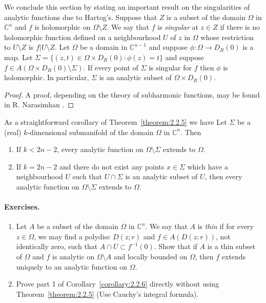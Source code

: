We conclude this section by stating an important result on the singularities of analytic functions due to Hartog's. Suppose that $Z$ is a subset of the domain $\Omega$ in $\mathbb C^n$ and $f$ is holomorphic on $\Omega\setminus Z$. We say that $f$ is \emph{singular} at $z\in Z$ if there is no holomorphic function defined on a neighbourhood $U$ of $z$ in $\Omega$ whose restriction to $U\setminus Z$ is $f|U\setminus Z$.
 Let $\Omega$ be a domain in $\mathbb C^{n-1}$ and suppose $\phi:\Omega\to D_R(0)$ is a map. Let $\Sigma=\{(z,t)\in\Omega\times D_R(0):\phi(z)=t\}$ and suppose $f\in A(\Omega\times D_R(0)\setminus\Sigma)$. If every point of $\Sigma$ is singular for $f$ then $\phi$ is holomorphic. In particular, $\Sigma$ is an analytic subset of $\Omega\times D_R(0)$.
\begin{proof}
A proof, depending on the theory of subharmonic functions, may be found in R. Narasimhan \cite{bib:I:narasimhan-r:2}.
\end{proof}
As a straightforward corollary of Theorem~\ref{theorem:2.2.5} we have
 Let $\Sigma$ be a (real) $k$-dimensional submanifold of the domain $\Omega$ in $\mathbb C^n$. Then
\begin{enumerate}
\item If $k<2n-2$, every analytic function on $\Omega\setminus\Sigma$ extends to $\Omega$.
\item If $k=2n-2$ and there do not exist any points $x\in\Sigma$ which have a neighbourhood $U$ such that $U\cap\Sigma$ is an analytic subset of $U$, then every analytic function on $\Omega\setminus\Sigma$ extends to $\Omega$.
\end{enumerate}
\paragraph*{Exercises.}
\begin{enumerate}
\item Let $A$ be a subset of the domain $\Omega$ in $\mathbb C^n$. We say that $A$ is \emph{thin} if for every $z\in\Omega$, we may find a polydisc $D(z;r)$ and $f\in A(D(z;r))$, not identically zero, such that $A\cap U\subset f^{-1}(0)$. Show that if $A$ is a thin subset of $\Omega$ and $f$ is analytic on $\Omega\setminus A$ and locally bounded on $\Omega$, then $f$ extends uniquely to an analytic function on $\Omega$.
\item Prove part 1 of Corollary~\ref{corollary:2.2.6} directly without using Theorem~\ref{theorem:2.2.5} (Use Cauchy's integral formula).
\end{enumerate}
